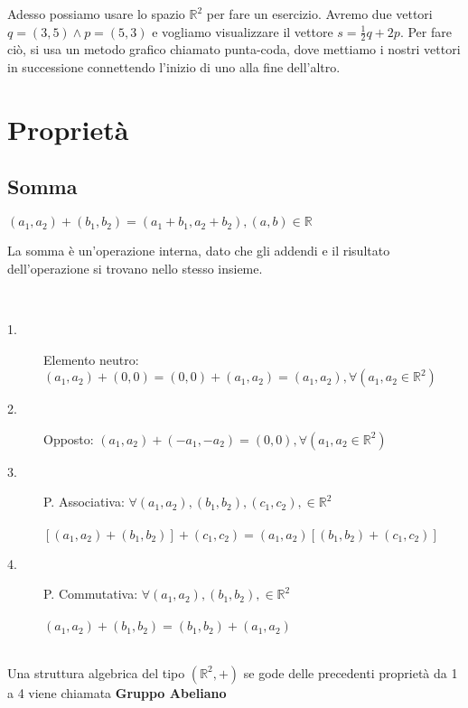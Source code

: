 Adesso possiamo usare lo spazio $\mathbb{R}^{2}$ per fare un esercizio. Avremo due vettori $q=(3,5)\wedge p=(5,3)$ e vogliamo visualizzare il vettore $s=\frac{1}{2}q+2p$. Per fare ciò, si usa un metodo grafico chiamato punta-coda, dove mettiamo i nostri vettori in successione connettendo l'inizio di uno alla fine dell'altro.

\begin{figure}[H]
	\centering
	\caption[Caption]{}
	\label{fig:sommavettori}
\end{figure}

\section{Proprietà}

\subsection{Somma}

\begin{definizione}
	$(a_{1}, a_{2})+(b_{1},b_{2})=(a_{1}+b_{1}, a_{2}+b_{2}), (a, b)\in \mathbb{R}$
\end{definizione}

La somma è un'operazione interna, dato che gli addendi e il risultato dell'operazione si trovano nello stesso insieme.

\begin{nota}
	\phantom{}\\
	\begin{description}
		\item[1.] Elemento neutro: $(a_{1}, a_{2})+(0,0)=(0,0)+(a_{1}, a_{2})=(a_{1}, a_{2}), \forall(a_{1}, a_{2}\in \mathbb{R}^{2})$
		\item[2.] Opposto: $(a_{1}, a_{2})+(-a_{1}, -a_{2})=(0, 0), \forall(a_{1}, a_{2}\in \mathbb{R}^{2})$\\
		\item[3.] P. Associativa: $\forall (a_{1}, a_{2}), (b_{1}, b_{2}), (c_{1}, c_{2}), \in \mathbb{R}^{2}$\\\\
		\phantom{texttexttextt}$[(a_{1}, a_{2})+(b_{1}, b_{2})]+(c_{1}, c_{2})=(a_{1}, a_{2})[(b_{1}, b_{2})+(c_{1}, c_{2})]$\\
		\item[4.] P. Commutativa: $\forall (a_{1}, a_{2}), (b_{1}, b_{2}), \in \mathbb{R}^{2}$\\\\
		\phantom{texttexttexttex}$(a_{1}, a_{2})+(b_{1}, b_{2})=(b_{1}, b_{2})+(a_{1}, a_{2})$
	\end{description}
\end{nota}
\leavevmode\\
Una struttura algebrica del tipo $(\mathbb{R}^{2},+)$ se gode delle precedenti proprietà da 1 a 4 viene chiamata \textbf{Gruppo Abeliano}

